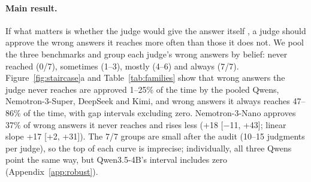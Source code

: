 \documentclass[11pt]{article}
\begin{document}
\paragraph{Main result.}
If what matters is whether the judge would give the answer itself
\citep{roytburg2026narcissists,krumdick2026nofreelabels}, a judge should approve the wrong answers it reaches more
often than those it does not. We pool the three benchmarks and group each judge's wrong answers by belief: never
reached (0/7), sometimes (1--3), mostly (4--6) and always (7/7). Figure~\ref{fig:staircase}a and
Table~\ref{tab:families} show that wrong answers the judge never reaches are approved 1--25\% of the time by the
pooled Qwens, Nemotron-3-Super, DeepSeek and Kimi, and wrong answers it always reaches 47--86\% of the time, with
gap intervals excluding zero. Nemotron-3-Nano approves 37\% of wrong answers it never reaches and rises less (+18
[$-$11, +43]; linear slope +17 [+2, +31]). The 7/7 groups are small after the audit (10--15 judgments per judge),
so the top of each curve is imprecise; individually, all three Qwens point the same way, but Qwen3.5-4B's interval
includes zero (Appendix~\ref{app:robust}).

\begin{table}[t]
\centering
\small
\setlength{\tabcolsep}{4pt}
\caption{Wrong answers approved (\%), by belief, audited labels. Gap: 7/7 minus 0/7 in points. Group sizes at 7/7:
32, 14, 15, 12 and 11 judgments.}
\label{tab:families}
\end{table}
\end{document}
